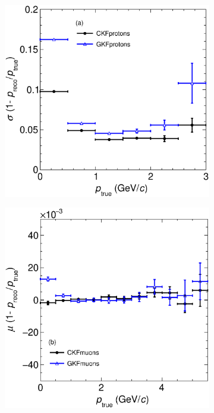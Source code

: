 \begin{figure}[t]
\begin{subfigure}{0.32\textwidth}
         \caption{}
         \label{fig:pResVSp211_Int}
     \end{subfigure}
    \begin{subfigure}{0.32\textwidth}
         \centering
         \includegraphics[width=\textwidth]{figures/ch5-KF_NDGAr/FullSample/Int/pRes/2D/RespVSp_2212.eps}
         \caption{}
         \label{fig:pResVSp2212_Int}
     \end{subfigure}
          \begin{subfigure}{0.32\textwidth}
         \centering
         \includegraphics[width=\textwidth]{figures/ch5-KF_NDGAr/FullSample/Int/pRes/2D/BiaspVSp_13.eps}

\end{subfigure}
\end{figure}
